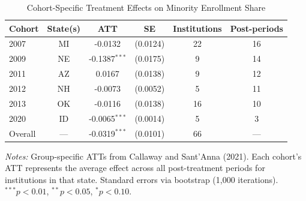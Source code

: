 \begin{table}[htbp]
\centering
\caption{Cohort-Specific Treatment Effects on Minority Enrollment Share}
\label{tab:cohort}
\begin{tabular}{lccccc}
\hline\hline
Cohort & State(s) & ATT & SE & Institutions & Post-periods \\
\hline
2007 & MI & -0.0132 & (0.0124) & 22 & 16 \\
2009 & NE & -0.1387$^{***}$ & (0.0175) & 9 & 14 \\
2011 & AZ & 0.0167 & (0.0138) & 9 & 12 \\
2012 & NH & -0.0073 & (0.0052) & 5 & 11 \\
2013 & OK & -0.0116 & (0.0138) & 16 & 10 \\
2020 & ID & -0.0065$^{***}$ & (0.0014) & 5 & 3 \\
\addlinespace
Overall & --- & -0.0319$^{***}$ & (0.0101) & 66 & --- \\
\hline\hline
\end{tabular}
\begin{tablenotes}
\item \textit{Notes:} Group-specific ATTs from Callaway and Sant'Anna (2021). Each cohort's ATT represents the average effect across all post-treatment periods for institutions in that state. Standard errors via bootstrap (1,000 iterations). $^{***}p<0.01$, $^{**}p<0.05$, $^{*}p<0.10$.
\end{tablenotes}
\end{table}
